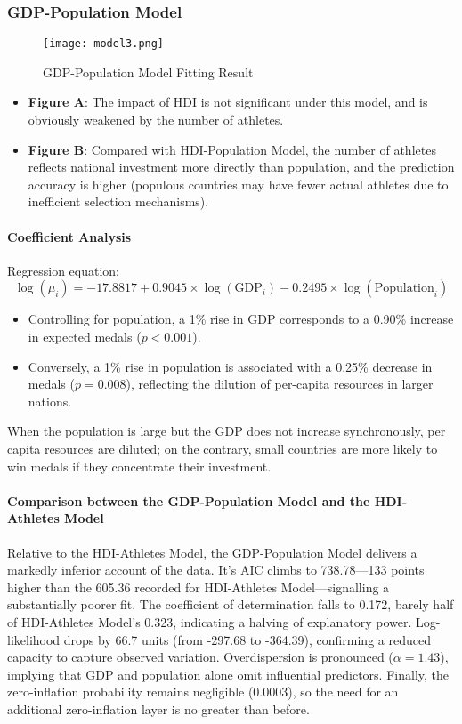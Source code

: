 \documentclass[11pt,twoside]{article}
\numberwithin{Theorem}{section}
\numberwithin{Definition}{section}
\numberwithin{Lemma}{section}
\numberwithin{Algorithm}{section}
\numberwithin{equation}{section}
\begin{document}
\subsubsection{GDP-Population Model}

\begin{figure}[!ht]
\centering
\texttt{[image: model3.png]}
\caption{GDP-Population Model Fitting Result}
\label{fig:model3}
\end{figure}

\begin{itemize}
    \item \textbf{Figure A}: The impact of HDI is not significant under this model, and is obviously weakened by the number of athletes.
    \item \textbf{Figure B}: Compared with HDI-Population Model, the number of athletes reflects national investment more directly than population, and the prediction accuracy is higher (populous countries may have fewer actual athletes due to inefficient selection mechanisms).
\end{itemize}

\paragraph{Coefficient Analysis}
Regression equation:
\[
\log(\mu_i) = -17.8817 + 0.9045 \times \log(\text{GDP}_i) - 0.2495 \times \log(\text{Population}_i)
\]

\begin{itemize}
    \item Controlling for population, a 1\% rise in GDP corresponds to a 0.90\% increase in expected medals ($p < 0.001$). 
    \item Conversely, a 1\% rise in population is associated with a 0.25\% decrease in medals ($p = 0.008$), reflecting the dilution of per-capita resources in larger nations.
\end{itemize}

When the population is large but the GDP does not increase synchronously, per capita resources are diluted; on the contrary, small countries are more likely to win medals if they concentrate their investment.

\paragraph{Comparison between the GDP-Population Model and the HDI-Athletes Model}
Relative to the HDI-Athletes Model, the GDP-Population Model delivers a markedly inferior account of the data. It's AIC climbs to 738.78---133 points higher than the 605.36 recorded for HDI-Athletes Model---signalling a substantially poorer fit. The coefficient of determination falls to 0.172, barely half of HDI-Athletes Model's 0.323, indicating a halving of explanatory power. Log-likelihood drops by 66.7 units (from -297.68 to -364.39), confirming a reduced capacity to capture observed variation. Overdispersion is pronounced ($\alpha = 1.43$), implying that GDP and population alone omit influential predictors. Finally, the zero-inflation probability remains negligible (0.0003), so the need for an additional zero-inflation layer is no greater than before.
\end{document}
